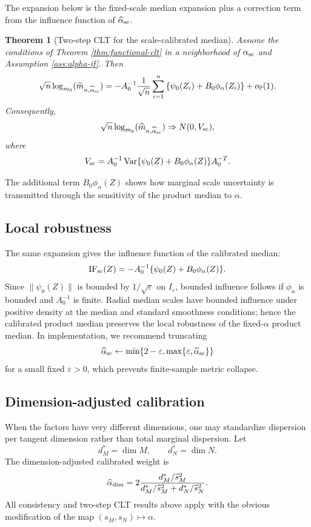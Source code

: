 \documentclass[11pt]{article}
\newtheorem{theorem}{Theorem}
\DeclareMathOperator{\Var}{Var}
\newcommand{\Pbb}{\mathbb P}
\newcommand{\eps}{\varepsilon}
\newcommand{\1}{\mathbf{1}}
\begin{document}
The expansion below is the fixed-scale median expansion plus a correction term
from the influence function of $\widehat\alpha_{\rm sc}$.
\begin{theorem}[Two-step CLT for the scale-calibrated median]\label{thm:calibrated-clt}
Assume the conditions of Theorem \ref{thm:functional-clt} in a neighborhood of $\alpha_{\rm sc}$ and Assumption \ref{ass:alpha-if}.  Then
\begin{equation}\label{eq:calibrated-linearization}
 \sqrt n\log_{m_0}(\widehat m_{n,\widehat\alpha_{\rm sc}})
 =
 -A_0^{-1}\frac1{\sqrt n}\sum_{i=1}^n
 \left\{\psi_0(Z_i)+B_0\phi_\alpha(Z_i)\right\}
 +o_{\Pbb}(1).
\end{equation}
Consequently,
\begin{equation}\label{eq:calibrated-clt}
 \sqrt n\log_{m_0}(\widehat m_{n,\widehat\alpha_{\rm sc}})
 \Rightarrow
 N(0,V_{\rm sc}),
\end{equation}
where
\begin{equation}\label{eq:Vsc}
 V_{\rm sc}
 =
 A_0^{-1}
 \Var\{\psi_0(Z)+B_0\phi_\alpha(Z)\}
 A_0^{-T}.
\end{equation}
\end{theorem}
The additional term $B_0\phi_\alpha(Z)$ shows how marginal scale uncertainty is
transmitted through the sensitivity of the product median to $\alpha$.

\subsection{Local robustness}

The same expansion gives the influence function of the calibrated median:
\begin{equation}\label{eq:calibrated-if}
 \operatorname{IF}_{\rm sc}(Z)
 =-A_0^{-1}\{\psi_0(Z)+B_0\phi_\alpha(Z)\}.
\end{equation}
Since $\|\psi_0(Z)\|$ is bounded by $1/\sqrt\eps$ on $I_\eps$, bounded influence follows if $\phi_\alpha$ is bounded and $A_0^{-1}$ is finite.  Radial median scales have bounded influence under positive density at the median and standard smoothness conditions; hence the calibrated product median preserves the local robustness of the fixed-$\alpha$ product median.  In implementation, we recommend truncating
\[
 \widehat\alpha_{\rm sc}\leftarrow
 \min\{2-\eps,\max\{\eps,\widehat\alpha_{\rm sc}\}\}
\]
for a small fixed $\eps>0$, which prevents finite-sample metric collapse.

\subsection{Dimension-adjusted calibration}
When the factors have very different dimensions, one may standardize dispersion
per tangent dimension rather than total marginal dispersion.  Let
\[
 d_M^*=\dim M,
 \qquad
 d_N^*=\dim N.
\]
The dimension-adjusted calibrated weight is
\begin{equation}\label{eq:dimension-adjusted-alpha}
 \widehat\alpha_{\rm dim}
 =
 2\frac{d_M^*/\widehat s_M^2}
 {d_M^*/\widehat s_M^2+d_N^*/\widehat s_N^2}.
\end{equation}
All consistency and two-step CLT results above apply with the obvious modification of the map $(s_M,s_N)\mapsto\alpha$.
\end{document}
